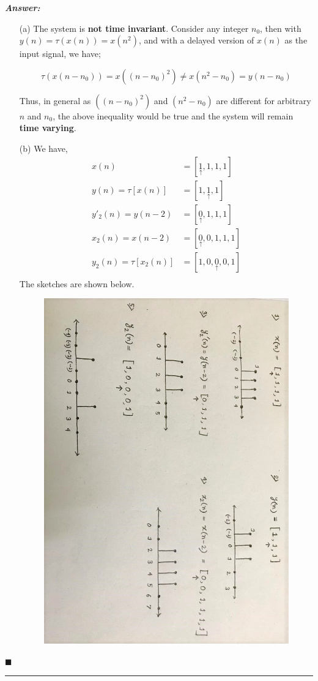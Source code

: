 \documentclass[12pt]{article}
\theoremstyle{definition}
\newenvironment{answer}{
    \textbf{\textit{Answer:}} \qquad
}{\hfill $\blacksquare$ \\ \begin{center}
    \rule{0.6\linewidth}{0.5px}    
\end{center}
}
\begin{document}
\begin{answer}
    \begin{enumerate}
        \item[(a)] The system is \textbf{not time invariant}. Consider any integer $n_0$, then with $y(n) = \tau(x(n)) = x(n^2)$, and with a delayed version of $x(n)$ as the input signal, we have;
        
        $$
        \tau(x(n - n_0)) = x((n - n_0)^2) \neq x(n^2 - n_0) = y(n - n_0)
        $$
    
        Thus, in general as $((n - n_0)^2)$ and $(n^2 - n_0)$ are different for arbitrary $n$ and $n_0$, the above inequality would be true and the system will remain \textbf{time varying}.
    
        \item[(b)] We have,
        \begin{align*}
            x(n) & = [\underset{\uparrow}{1}, 1, 1, 1]\\
            y(n) = \tau[x(n)] & = [1, \underset{\uparrow}{1}, 1]\\
            y'_2(n) = y(n-2) & = [\underset{\uparrow}{0}, 1, 1, 1]\\
            x_2(n) = x(n-2) & = [\underset{\uparrow}{0}, 0, 1, 1, 1]\\
            y_2(n) = \tau[x_2(n)] & = [1, 0, \underset{\uparrow}{0}, 0, 1]\\
        \end{align*} 
        The sketches are shown below.
        \begin{figure}[H]
            \centering
            \includegraphics[height= \linewidth, angle = 90]{q10_b.jpeg}
        \end{figure} 


\end{enumerate}
\end{answer}
\end{document}
